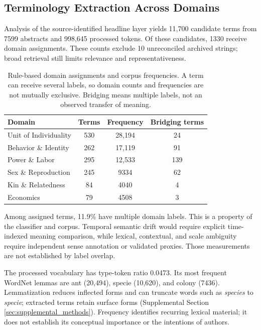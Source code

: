\documentclass[
]{article}
\numberwithin{equation}{section}
\begin{document}
\subsection{Terminology Extraction Across
Domains}\label{terminology-extraction-across-domains}

Analysis of the source-identified headline layer yields 11,700 candidate
terms from 7599 abstracts and 998,645 processed tokens. Of these
candidates, 1330 receive domain assignments. These counts exclude 10
unreconciled archived strings; broad retrieval still limits relevance
and representativeness.

\begin{table}[h]
\centering
\begin{tabular}{|l|c|c|c|}
\hline
\textbf{Domain} & \textbf{Terms} & \textbf{Frequency} & \textbf{Bridging terms} \\
\hline
Unit of Individuality & 530 & 28,194 & 24 \\
Behavior \& Identity & 262 & 17,119 & 91 \\
Power \& Labor & 295 & 12,533 & 139 \\
Sex \& Reproduction & 245 & 9334 & 62 \\
Kin \& Relatedness & 84 & 4040 & 4 \\
Economics & 79 & 4508 & 3 \\
\hline
\end{tabular}
\caption{Rule-based domain assignments and corpus frequencies. A term can receive several labels, so domain counts and frequencies are not mutually exclusive. Bridging means multiple labels, not an observed transfer of meaning.}
\label{tab:terminology_extraction}
\end{table}

Among assigned terms, 11.9\% have multiple domain labels. This is a
property of the classifier and corpus. Temporal semantic drift would
require explicit time-indexed meaning comparison, while lexical,
contextual, and scale ambiguity require independent sense annotation or
validated proxies. Those measurements are not established by label
overlap.

The processed vocabulary has type-token ratio 0.0473. Its most frequent
WordNet lemmas are ant (20,494), specie (10,620), and colony (7436).
Lemmatization reduces inflected forms and can truncate words such as
\emph{species} to \emph{specie}; extracted terms retain surface forms
(Supplemental Section \ref{sec:supplemental_methods}). Frequency
identifies recurring lexical material; it does not establish its
conceptual importance or the intentions of authors.
\end{document}
